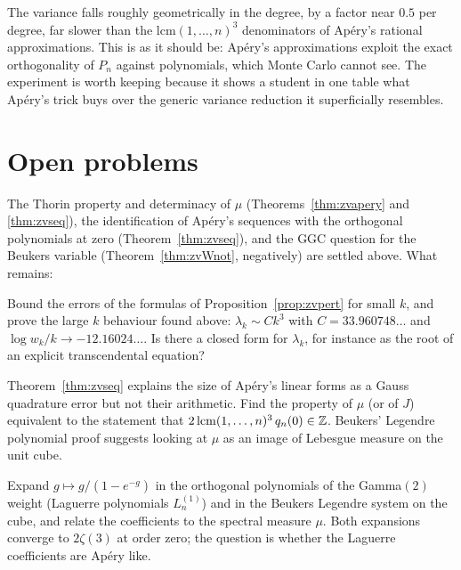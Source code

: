The variance falls roughly geometrically in the degree, by a factor near $0.5$ per degree, far slower than the $\mathrm{lcm}(1,\dots,n)^3$ denominators of Ap\'ery's rational approximations. This is as it should be: Ap\'ery's approximations exploit the exact orthogonality of $P_n$ against polynomials, which Monte Carlo cannot see. The experiment is worth keeping because it shows a student in one table what Ap\'ery's trick buys over the generic variance reduction it superficially resembles.

\section{Open problems}

The Thorin property and determinacy of $\mu$ (Theorems~\ref{thm:zvapery} and \ref{thm:zvseq}), the identification of Ap\'ery's sequences with the orthogonal polynomials at zero (Theorem~\ref{thm:zvseq}), and the GGC question for the Beukers variable (Theorem~\ref{thm:zvWnot}, negatively) are settled above. What remains:

\begin{problem}\label{op:zvpert}
Bound the errors of the formulas of Proposition~\ref{prop:zvpert} for small $k$, and prove the large $k$ behaviour found above: $\lambda_k\sim Ck^3$ with $C=33.960748\ldots$ and $\log w_k/k\to-12.16024\ldots$. Is there a closed form for $\lambda_k$, for instance as the root of an explicit transcendental equation?
\end{problem}

\begin{problem}\label{op:zvdenom}
Theorem~\ref{thm:zvseq} explains the size of Ap\'ery's linear forms as a Gauss quadrature error but not their arithmetic. Find the property of $\mu$ (or of $J$) equivalent to the statement that $2\,\mathrm{lcm}(1,\dots,n)^3\,q_n(0)\in\mathbb{Z}$. Beukers' Legendre polynomial proof suggests looking at $\mu$ as an image of Lebesgue measure on the unit cube.
\end{problem}

\begin{problem}\label{op:zvlegendre}
Expand $g\mapsto g/(1-e^{-g})$ in the orthogonal polynomials of the Gamma$(2)$ weight (Laguerre polynomials $L_n^{(1)}$) and in the Beukers Legendre system on the cube, and relate the coefficients to the spectral measure $\mu$. Both expansions converge to $2\zeta(3)$ at order zero; the question is whether the Laguerre coefficients are Ap\'ery like.
\end{problem}

